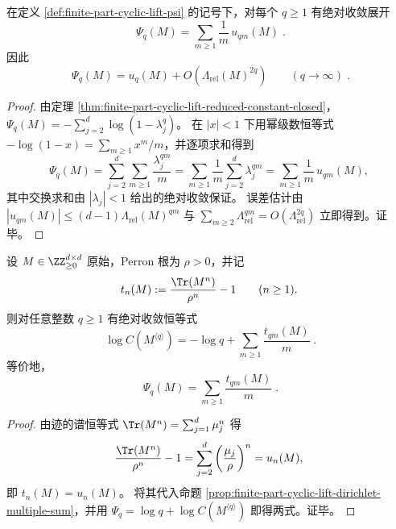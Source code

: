 \begin{proposition}\label{prop:finite-part-cyclic-lift-dirichlet-multiple-sum}
在定义 \ref{def:finite-part-cyclic-lift-psi} 的记号下，对每个 \(q\ge 1\) 有绝对收敛展开
\[
\boxed{\;
\Psi_q(M)=\sum_{m\ge 1}\frac{1}{m}\,u_{qm}(M)\; }.
\]
因此
\[
\boxed{\;
\Psi_q(M)=u_q(M)+O\!\left(\Lambda_{\mathrm{rel}}(M)^{2q}\right)\qquad(q\to\infty)\; }.
\]
\end{proposition}
\begin{proof}
由定理 \ref{thm:finite-part-cyclic-lift-reduced-constant-closed}，
\(
\Psi_q(M)=-\sum_{j=2}^{d}\log(1-\lambda_j^q)
\)。
在 \(|x|<1\) 下用幂级数恒等式 \(-\log(1-x)=\sum_{m\ge 1}x^m/m\)，并逐项求和得到
\[
\Psi_q(M)=\sum_{j=2}^{d}\sum_{m\ge 1}\frac{\lambda_j^{qm}}{m}
=\sum_{m\ge 1}\frac{1}{m}\sum_{j=2}^{d}\lambda_j^{qm}
=\sum_{m\ge 1}\frac{1}{m}\,u_{qm}(M),
\]
其中交换求和由 \(|\lambda_j|<1\) 给出的绝对收敛保证。
误差估计由
\(
|u_{qm}(M)|\le (d-1)\Lambda_{\mathrm{rel}}(M)^{qm}
\)
与
\(
\sum_{m\ge 2}\Lambda_{\mathrm{rel}}^{qm}=O(\Lambda_{\mathrm{rel}}^{2q})
\)
立即得到。证毕。
\end{proof}

\begin{corollary}\label{cor:finite-part-cyclic-lift-trace-sieve}
设 \(M\in\ZZ_{\ge 0}^{d\times d}\) 原始，Perron 根为 \(\rho>0\)，并记
\[
t_n(M):=\frac{\Tr(M^n)}{\rho^n}-1\qquad(n\ge 1).
\]
则对任意整数 \(q\ge 1\) 有绝对收敛恒等式
\[
\boxed{\;
\log C(M^{\langle q\rangle})
=-\log q+\sum_{m\ge 1}\frac{t_{qm}(M)}{m}\; }.
\]
等价地，
\[
\boxed{\;
\Psi_q(M)=\sum_{m\ge 1}\frac{t_{qm}(M)}{m}\; }.
\]
\end{corollary}
\begin{proof}
由迹的谱恒等式 \(\Tr(M^n)=\sum_{j=1}^{d}\mu_j^n\) 得
\[
\frac{\Tr(M^n)}{\rho^n}-1=\sum_{j=2}^{d}\left(\frac{\mu_j}{\rho}\right)^{n}=u_n(M),
\]
即 \(t_n(M)=u_n(M)\)。
将其代入命题 \ref{prop:finite-part-cyclic-lift-dirichlet-multiple-sum}，并用 \(\Psi_q=\log q+\log C(M^{\langle q\rangle})\) 即得两式。证毕。
\end{proof}

